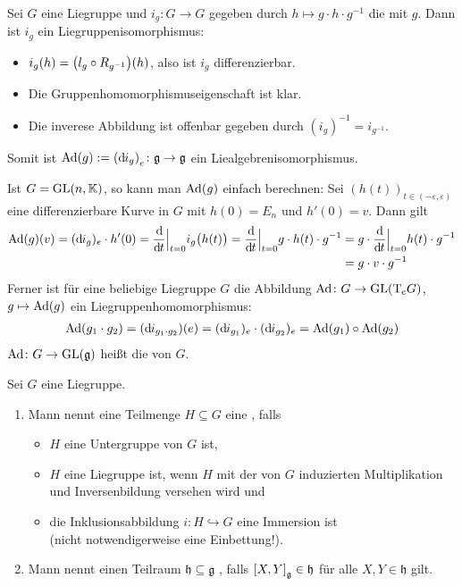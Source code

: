 \begin{beispiel*}[{name=[Konjugation und adjungierte Darstellung]}]
	Sei $G$ eine Liegruppe und $i_g \colon G \to G$ gegeben durch $h \mapsto g \cdot h \cdot g^{-1}$ die  mit $g$.
	Dann ist $i_g$ ein Liegruppenisomorphismus:
	\begin{itemize}[itemsep=0pt]
		\item $i_g(h) = \enbrace*{l_g \circ R_{g^{-1}}}(h)$, also ist $i_g$ differenzierbar.
		\item Die Gruppenhomomorphismuseigenschaft ist klar. 
		\item Die inverese Abbildung ist offenbar gegeben durch $(i_g)^{-1}= i_{g^{-1}}$.
	\end{itemize}
	Somit ist $\Ad(g) := \enbrace*{\mathd i_g}_e \colon \mathfrak{g} \to \mathfrak{g}$ ein Liealgebrenisomorphismus.
	
	Ist $G = \GL(n,\mathbb{K})$, so kann man $\Ad(g)$ einfach berechnen:
	Sei $(h(t))_{t \in (-\varepsilon,\varepsilon)}$ eine differenzierbare Kurve in $G$ mit $h(0)= E_n$ und $h'(0)=v$.
	Dann gilt
	\begin{align}
		\Ad(g)(v)= (\mathd i_g)_e \cdot h'(0) = \diffd{}{t}\Big|_{t=0} i_g \enbrace[\big]{h(t)} = \diffd{}{t}\Big|_{t=0} g \cdot h(t) \cdot g^{-1}
		&= g \cdot \diffd{}{t}\Big|_{t=0} h(t) \cdot g^{-1}\\
		&= g \cdot v \cdot g^{-1}
	\end{align}
	Ferner ist für eine beliebige Liegruppe $G$ die Abbildung $\Ad \colon G \to \GL\enbrace*{\Tmap_e G}$, $g \mapsto \Ad(g)$ ein Liegruppenhomomorphismus:
	\begin{align}
		\Ad(g_1 \cdot g_2) = (\mathd i_{g_1 \cdot g_2})(e) = (\mathd i_{g_1})_e \cdot (\mathd i_{g_2})_e = \Ad(g_1) \circ \Ad(g_2)
	\end{align}
	$\Ad \colon G \to \GL(\mathfrak{g})$ heißt die  von $G$.
\end{beispiel*}

\begin{definition}[{name=[{Lieuntergruppe und Lieunteralgebra}]}]
	Sei $G$ eine Liegruppe.
	\begin{enumerate}[1)]
		\item Mann nennt eine Teilmenge $H \subseteq G$ eine , falls 
		\begin{itemize}
			\item $H$ eine Untergruppe von $G$ ist,
			\item $H$ eine Liegruppe ist, wenn $H$ mit der von $G$ induzierten Multiplikation und Inversenbildung versehen wird und
			\item die Inklusionsabbildung $i \colon H \hookrightarrow G$ eine Immersion ist \\ 
			(nicht notwendigerweise eine Einbettung!).
		\end{itemize}
		\item Mann nennt einen Teilraum $\mathfrak{h} \subseteq \mathfrak{g}$ , falls $\benbrace*{X,Y}_\mathfrak{g} \in \mathfrak{h}$ für alle $X,Y \in \mathfrak{h}$ gilt.
	\end{enumerate}
\end{definition}

